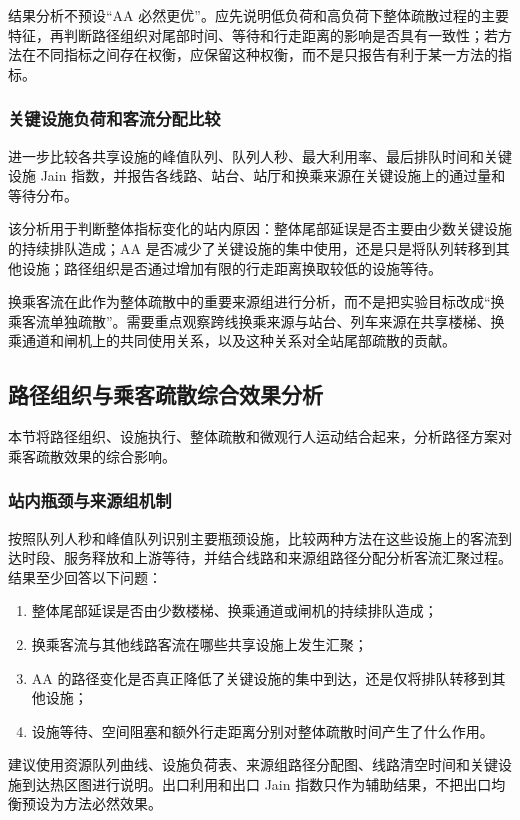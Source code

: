 \documentclass[UTF8,a4paper,12pt]{ctexart}
\begin{document}
结果分析不预设“AA 必然更优”。应先说明低负荷和高负荷下整体疏散过程的主要特征，再判断路径组织对尾部时间、等待和行走距离的影响是否具有一致性；若方法在不同指标之间存在权衡，应保留这种权衡，而不是只报告有利于某一方法的指标。

\subsubsection{关键设施负荷和客流分配比较}

进一步比较各共享设施的峰值队列、队列人秒、最大利用率、最后排队时间和关键设施 Jain 指数，并报告各线路、站台、站厅和换乘来源在关键设施上的通过量和等待分布。

该分析用于判断整体指标变化的站内原因：整体尾部延误是否主要由少数关键设施的持续排队造成；AA 是否减少了关键设施的集中使用，还是只是将队列转移到其他设施；路径组织是否通过增加有限的行走距离换取较低的设施等待。

换乘客流在此作为整体疏散中的重要来源组进行分析，而不是把实验目标改成“换乘客流单独疏散”。需要重点观察跨线换乘来源与站台、列车来源在共享楼梯、换乘通道和闸机上的共同使用关系，以及这种关系对全站尾部疏散的贡献。

\subsection{路径组织与乘客疏散综合效果分析}

本节将路径组织、设施执行、整体疏散和微观行人运动结合起来，分析路径方案对乘客疏散效果的综合影响。

\subsubsection{站内瓶颈与来源组机制}

按照队列人秒和峰值队列识别主要瓶颈设施，比较两种方法在这些设施上的客流到达时段、服务释放和上游等待，并结合线路和来源组路径分配分析客流汇聚过程。结果至少回答以下问题：
\begin{enumerate}
    \item 整体尾部延误是否由少数楼梯、换乘通道或闸机的持续排队造成；
    \item 换乘客流与其他线路客流在哪些共享设施上发生汇聚；
    \item AA 的路径变化是否真正降低了关键设施的集中到达，还是仅将排队转移到其他设施；
    \item 设施等待、空间阻塞和额外行走距离分别对整体疏散时间产生了什么作用。
\end{enumerate}

建议使用资源队列曲线、设施负荷表、来源组路径分配图、线路清空时间和关键设施到达热区图进行说明。出口利用和出口 Jain 指数只作为辅助结果，不把出口均衡预设为方法必然效果。
\end{document}
